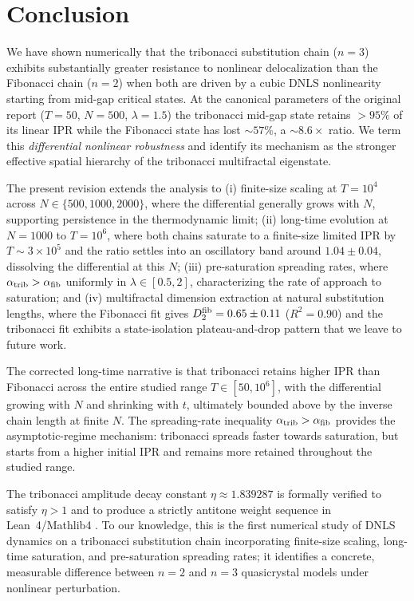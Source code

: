 \documentclass[12pt,a4paper]{article}
\begin{document}
\section{Conclusion}

We have shown numerically that the tribonacci substitution chain ($n=3$)
exhibits substantially greater resistance to nonlinear delocalization than
the Fibonacci chain ($n=2$) when both are driven by a cubic DNLS
nonlinearity starting from mid-gap critical states. At the canonical
parameters of the original report ($T=50$, $N=500$, $\lambda=1.5$) the
tribonacci mid-gap state retains $>95\%$ of its linear IPR while the
Fibonacci state has lost $\sim 57\%$, a $\sim 8.6\times$ ratio. We term
this \emph{differential nonlinear robustness} and identify its mechanism
as the stronger effective spatial hierarchy of the tribonacci multifractal
eigenstate.

The present revision extends the analysis to (i) finite-size scaling at
$T=10^4$ across $N \in \{500, 1000, 2000\}$, where the differential
generally grows with $N$, supporting persistence in the thermodynamic
limit; (ii) long-time evolution at $N=1000$ to $T=10^6$, where both chains
saturate to a finite-size limited IPR by $T \sim 3\times10^5$ and the
ratio settles into an oscillatory band around $1.04\pm0.04$, dissolving
the differential at this $N$; (iii) pre-saturation spreading rates, where
$\alpha_{\rm trib} > \alpha_{\rm fib}$ uniformly in $\lambda \in [0.5,2]$,
characterizing the rate of approach to saturation; and (iv) multifractal
dimension extraction at natural substitution lengths, where the Fibonacci
fit gives $D_2^{\rm fib} = 0.65 \pm 0.11$ ($R^2=0.90$) and the tribonacci
fit exhibits a state-isolation plateau-and-drop pattern that we leave to
future work.

The corrected long-time narrative is that tribonacci retains higher IPR
than Fibonacci across the entire studied range $T \in [50, 10^6]$, with
the differential growing with $N$ and shrinking with $t$, ultimately
bounded above by the inverse chain length at finite $N$. The
spreading-rate inequality $\alpha_{\rm trib} > \alpha_{\rm fib}$ provides
the asymptotic-regime mechanism: tribonacci spreads faster towards
saturation, but starts from a higher initial IPR and remains more retained
throughout the studied range.

The tribonacci amplitude decay constant $\eta \approx 1.839287$ is formally
verified to satisfy $\eta > 1$ and to produce a strictly antitone weight
sequence in Lean~4/Mathlib4 \cite{AXLE2026}. To our knowledge, this is the
first numerical study of DNLS dynamics on a tribonacci substitution chain
incorporating finite-size scaling, long-time saturation, and pre-saturation
spreading rates; it identifies a concrete, measurable difference between
$n=2$ and $n=3$ quasicrystal models under nonlinear perturbation.
\end{document}
